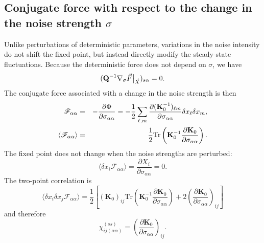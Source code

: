 \subsection{Conjugate force with respect to the change in the noise strength $\sigma$}
\quad Unlike perturbations of deterministic parameters, variations in the noise intensity do not shift the fixed point, but instead directly modify the steady-state fluctuations. Because the deterministic force does not depend on $\sigma$, we have
\begin{equation}
    ({\bf Q}^{-1}\nabla_\sigma \vec{F}\big|_{\vec{X}})_{s\alpha} = 0.
\end{equation}
The conjugate force associated with a change in the noise strength is then
\begin{eqnarray}
    \mathscr{F}_{\alpha\alpha} &=& -\frac{\partial \Phi}{\partial \sigma_{\alpha\alpha}} = -\frac{1}{2} \sum_{\ell, m} \frac{\partial ({\bf K}_0^{-1})_{\ell m}}{\partial \sigma_{\alpha\alpha}} \delta x_\ell \delta x_m,\\
    \langle \mathscr{F}_{\alpha\alpha} \rangle &=& \frac{1}{2} \text{Tr} \left( {\bf K}_0^{-1} \frac{\partial {\bf K}_0}{\partial \sigma_{\alpha\alpha}} \right).
\end{eqnarray}
The fixed point does not change when the noise strengths are perturbed:
\begin{equation}
    \langle \delta x_i \mathscr{F}_{\alpha\alpha}\rangle = \frac{\partial X_i}{\partial \sigma_{\alpha\alpha}}=0.
\end{equation}
The two-point correlation is
\begin{equation}
    \langle \delta x_i \delta x_j \mathscr{F}_{\alpha\alpha} \rangle = \frac{1}{2} \left[ (\mathbf{K}_0)_{ij} \text{Tr}\left( \mathbf{K}_0^{-1}\frac{\partial \mathbf{K}_0}{\partial \sigma_{\alpha\alpha}} \right) + 2 \left( \frac{\partial \mathbf{K}_0}{\partial \sigma_{\alpha\alpha}} \right)_{ij} \right]
\end{equation}
and therefore
\begin{equation}
    \chi_{ij(\alpha\alpha)}^{(ss)} = \left( \frac{\partial \mathbf{K}_0}{\partial \sigma_{\alpha\alpha}} \right)_{ij}.
    \label{chiKosigma_ss_appB}
\end{equation}

